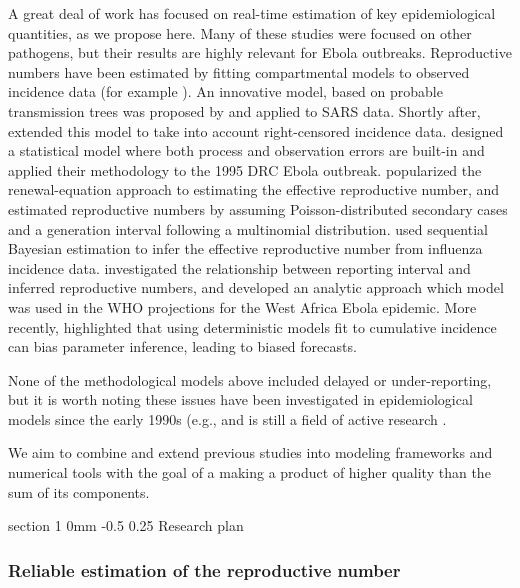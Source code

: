\documentclass[12pt]{article}
\makeatletter
\renewcommand{\section}{\@startsection  %
{section}%
{1}%
{0mm}%
{-0.5\baselineskip}%
{0.25\baselineskip}%
{\normalfont\Large\bfseries}}%
\makeatother
\begin{document}
A great deal of work has focused on real-time estimation of key epidemiological quantities, as we propose here. Many of these studies were focused on other pathogens, but their results are highly relevant for Ebola outbreaks. Reproductive numbers have been estimated by fitting compartmental models to observed incidence data (for example \cite{Chowell2004}). An innovative model, based on probable transmission trees was proposed by \cite{Wallinga2004te} and applied to SARS data. Shortly after, \cite{Cauchemez2006ei} extended this model to take into account right-censored incidence data. \cite{Lekone2006ez} designed a statistical model where both process and observation errors are built-in and applied their methodology to the 1995 DRC Ebola outbreak. \cite{Wallinga2007bk} popularized the renewal-equation approach to estimating the effective reproductive number, and \cite{ForsbergWhite2008iy} estimated reproductive numbers by assuming Poisson-distributed secondary cases and a generation interval following a multinomial distribution. \cite{Bettencourt2008iv} used sequential Bayesian estimation to infer the effective reproductive number from influenza incidence data. \cite{Nishiura2009ct} investigated the relationship between reporting interval and inferred reproductive numbers, and \cite{Cori2014ia} developed an analytic approach which model was used in the WHO projections \cite{Ebola2014d} for the West Africa Ebola epidemic. More recently, \cite{King2015kb} highlighted that using deterministic models fit to cumulative incidence can bias parameter inference, leading to biased forecasts.

None of the methodological models above included delayed or under-reporting, but it is worth noting these issues have been investigated in epidemiological models since the early 1990s (e.g., \cite{Brookmeyer1990uc, Lawless1994tq} and is still a field of active research \cite{Azmon2013bh, Noufaily2015vl}.

We aim to combine and extend previous studies into modeling frameworks and numerical tools with the goal of a making a product of higher quality than the sum of its components.

\section{Research plan}

\subsubsection{Reliable estimation of the reproductive number}
\end{document}
